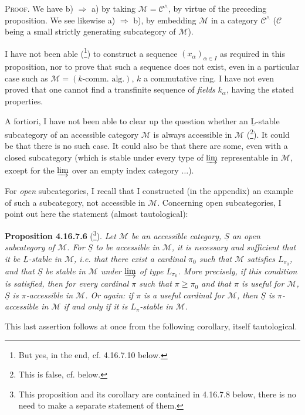 \documentclass[11pt]{article}
\newcommand{\printedpage}[1]{\marginpar{\footnotesize p.~#1}}
\newcommand{\msp}[1]{\marginpar{\footnotesize [#1]}}
\newcommand{\cM}{\mathcal{M}}
\newcommand{\cC}{\mathcal{C}}
\newcommand{\uS}{\underline{S}}
\begin{document}
\textsc{Proof}. We have b) $\Longrightarrow$ a) by taking $\cM = \cC^\wedge$, by virtue of the preceding proposition. We see likewise a) $\Longrightarrow$ b), by embedding $\cM$ in a category $\cC^\wedge$ ($\cC$ being a small strictly generating subcategory of $\cM$).

I have not been able (\footnote{But yes, in the end, cf. 4.16.7.10 below.}) to construct a sequence $(x_\alpha)_{\alpha\in I}$ as required in this proposition, nor to prove that such a sequence does not exist, even in a particular case such as $\cM = (k\text{-comm. alg.})$, $k$ a commutative ring. I have not
\msp{page 485}
even proved that one cannot find a transfinite sequence of \textit{fields} $k_\alpha$, having the stated properties.

A fortiori, I have not been able to clear up the question whether an $\underline{\mathrm{L}}$-stable subcategory of an accessible category $\cM$ is always accessible in $\cM$ (\footnote{This is false, cf. below.}). It could be that there is no such case. It could also be that there are some, even with a closed subcategory (which is stable under every type of $\varinjlim$ representable in $\cM$, except for the $\varinjlim$ over an empty index category $\ldots$).

\printedpage{188}

For \textit{open} subcategories, I recall that I constructed (in the appendix) an example of such a subcategory, not accessible in $\cM$. Concerning open subcategories, I point out here the statement (almost tautological):

\msp{page 486}
\textbf{Proposition 4.16.7.6} (\footnote{This proposition and its corollary are contained in 4.16.7.8 below, there is no need to make a separate statement of them.}). \textit{Let $\cM$ be an accessible category, $\uS$ an \textup{open} subcategory of $\cM$. For $\uS$ to be accessible in $\cM$, it is necessary and sufficient that it be $\underline{L}$-stable in $\cM$, i.e. that there exist a cardinal $\pi_0$ such that $\cM$ satisfies $L_{\pi_0}$, and that $\uS$ be stable in $\cM$ under $\varinjlim$ of type $L_{\pi_0}$. More precisely, if this condition is satisfied, then for every cardinal $\pi$ such that $\pi \geqslant \pi_0$ and that $\pi$ is useful for $\cM$, $\uS$ is $\pi$-accessible in $\cM$. Or again: if $\pi$ is a useful cardinal for $\cM$, then $\uS$ is $\pi$-accessible in $\cM$ if and only if it is $L_\pi$-stable in $\cM$.}

This last assertion follows at once from the following corollary, itself tautological.
\end{document}
